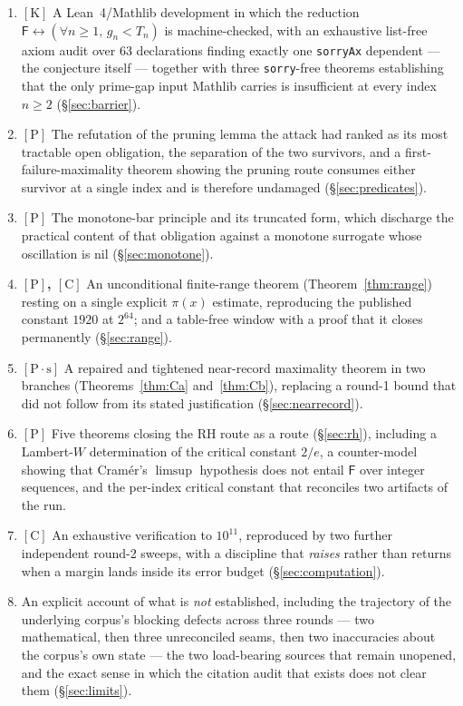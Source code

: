\documentclass[11pt,a4paper]{article}
\theoremstyle{plain}
\theoremstyle{definition}
\theoremstyle{remark}
\newcommand{\cK}{{[\mathrm{K}]}}
\newcommand{\cP}{{[\mathrm{P}]}}
\newcommand{\cPs}{{[\mathrm{P}\!\cdot\!\mathrm{s}]}}
\newcommand{\cC}{{[\mathrm{C}]}}
\newcommand{\Fb}{\mathsf{F}}
\begin{document}
\begin{enumerate}
\item \textbf{$\cK$} A Lean~4/Mathlib development in which the reduction
  $\Fb \leftrightarrow (\forall n \ge 1,\, g_n < T_n)$ is machine-checked, with an
  exhaustive list-free axiom audit over 63 declarations finding exactly one
  \texttt{sorryAx} dependent --- the conjecture itself --- together with three
  \texttt{sorry}-free theorems establishing that the only prime-gap input Mathlib carries is
  insufficient at every index $n \ge 2$ (\S\ref{sec:barrier}).
\item \textbf{$\cP$} The refutation of the pruning lemma the attack had ranked as its most
  tractable open obligation, the separation of the two survivors, and a
  first-failure-maximality theorem showing the pruning route consumes either survivor at a
  single index and is therefore undamaged (\S\ref{sec:predicates}).
\item \textbf{$\cP$} The monotone-bar principle and its truncated form, which discharge the
  practical content of that obligation against a monotone surrogate whose oscillation is nil
  (\S\ref{sec:monotone}).
\item \textbf{$\cP$, $\cC$} An unconditional finite-range theorem
  (Theorem~\ref{thm:range}) resting on a single explicit $\pi(x)$ estimate, reproducing the
  published constant $1920$ at $2^{64}$; and a table-free window with a proof that it closes
  permanently (\S\ref{sec:range}).
\item \textbf{$\cPs$} A repaired and tightened near-record maximality theorem in two branches
  (Theorems~\ref{thm:Ca} and~\ref{thm:Cb}), replacing a round-1 bound that did not follow from
  its stated justification (\S\ref{sec:nearrecord}).
\item \textbf{$\cP$} Five theorems closing the RH route as a route (\S\ref{sec:rh}),
  including a Lambert-$W$ determination of the critical constant $2/e$, a counter-model
  showing that Cram\'er's $\limsup$ hypothesis does not entail $\Fb$ over integer sequences,
  and the per-index critical constant that reconciles two artifacts of the run.
\item \textbf{$\cC$} An exhaustive verification to $10^{11}$, reproduced by two further
  independent round-2 sweeps, with a discipline that \emph{raises} rather than returns when a
  margin lands inside its error budget (\S\ref{sec:computation}).
\item An explicit account of what is \emph{not} established, including the trajectory of the
  underlying corpus's blocking defects across three rounds --- two mathematical, then three
  unreconciled seams, then two inaccuracies about the corpus's own state --- the two
  load-bearing sources that remain unopened, and the exact sense in which the citation audit
  that exists does not clear them (\S\ref{sec:limits}).
\end{enumerate}
\end{document}
